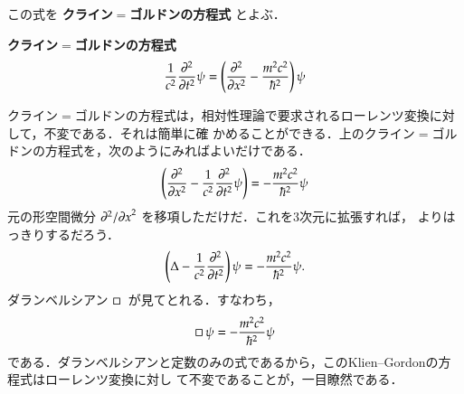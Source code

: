    この式を \textbf{クライン$=$ゴルドンの方程式} とよぶ．\\
            \begin{center}
                \begin{shadebox}
                \textbf{クライン$=$ゴルドンの方程式}
                    \begin{align}\label{eq:KGEquation}
                        \frac{1}{c^{2}}\frac{\rd^{2}}{\rd t^{2}} \psi
                             = \left(
                                    \frac{\rd^{2}}{\rd x^{2}} - \frac{m^{2}c^{2}}{\hbar^{2}}
                                \right) \psi
                    \end{align}
                \end{shadebox}
            \end{center}

    クライン$=$ゴルドンの方程式は，相対性理論で要求されるローレンツ変換に対して，不変である．それは簡単に確
    かめることができる．上のクライン$=$ゴルドンの方程式を，次のようにみればよいだけである．
        \begin{equation*}
            \left(
                \frac{\partial^{2}}{\partial x^{2}} - \frac{1}{c^{2}}\frac{\partial^{2}}{\partial t^{2}} \psi
            \right)
                =   - \frac{m^{2}c^{2}}{\hbar^{2}} \psi
        \end{equation*}
    元の形空間微分 $\partial^{2}/{\partial x}^{2}$ を移項しただけだ．これを3次元に拡張すれば，
    よりはっきりするだろう．
        \begin{equation*}
            \left(
                \Delta - \frac{1}{c^{2}}\frac{\partial^{2}}{\partial t^{2}}
            \right)  \psi
                =   - \frac{m^{2}c^{2}}{\hbar^{2}} \psi.
        \end{equation*}
    ダランベルシアン $\Box\,$ が見てとれる．すなわち，
        \begin{equation*}
                \Box\, \psi
                =   - \frac{m^{2}c^{2}}{\hbar^{2}} \psi
        \end{equation*}
    である．ダランベルシアンと定数のみの式であるから，このKlien--Gordonの方程式はローレンツ変換に対し
    て不変であることが，一目瞭然である．


